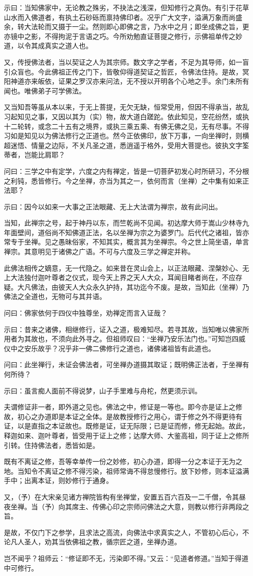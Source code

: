 示曰：当知佛家中，无论教之殊劣，不抉法之浅深，但知修行之真伪。有引于花草山水而入佛道者，有执土石砂砾而禀持佛印者。况乎广大文字，溢满万象而尚盛余，转大法轮而又摄于一尘。然则即心即佛之言，乃水中之月；即坐成佛之旨，更亦镜中之影，不得拘泥于言语之巧。今所劝勉直证菩提之修行，示佛祖单传之妙道，以令其成真实之道人也。

又，传授佛法者，当以契证之人为其宗师。数文字之学者，不足为其导师，如一盲引众盲也。今此佛祖正传之门下，皆敬仰得道契证之哲匠，令佛法住持。是故，冥阳神道亦来皈依，证果之罗汉亦来问法，无不授以开明各个心地之手。余门未所有闻也。唯佛弟子可学佛法。

又当知吾等虽从本以来，于无上菩提，无欠无缺，恒常受用，但因不得承当，故乱习起知见之事，又因以其为（实）物，故大道白蹉跎。依此知见，空花纷然，或执十二轮转，或念二十五有之境界，或执三乘五乘、有佛无佛之见，无有尽事。不得习如是知见以为佛法修行之正道也。然今正依佛印，放下万事，一向坐禅时，则横超迷悟、情量之边际，不关凡圣之道，悉逍遥于格外，受用大菩提也。彼执文字筌蒂者，岂能比肩耶？

问曰：三学之中有定学，六度之内有禅定，皆是一切菩萨初发心时所研习，不分根之利钝，悉皆修行。今之坐禅，亦当为其之一，依何而言（坐禅）之中集有如来正法耶？

示曰：因今以如来一大事之正法眼藏、无上大法谓为禅宗，故有此问出。

当知，此禅宗之号，起于神丹以东，而竺乾尚不见闻。初达摩大师于嵩山少林寺九年面壁间，道俗尚不知佛道正法，名以坐禅为宗之为婆罗门。后代代之诸祖，皆亦常专于坐禅。见之愚昧俗家，不知其实，概言其为坐禅宗。今之世上简坐语，单言禅宗。其意明见于诸佛之广语。不可与六度及三学之禅定并称。

此佛法相传之嫡意，无一代隐之。如来昔在灵山会上，以正法眼藏、涅槃妙心、无上大法独付迦叶尊者之仪式，现今天上界之天人大众，耳闻目睹者尚在，不应存疑。大凡佛法，由彼天人大众永久护持，其功迄今不废。是故，当知此（坐禅）乃佛法之全道也，无物可与其并语。

问曰：佛家依何于四仪中独尊坐，劝禅定而言入证哉？

示曰：昔来之诸佛，相继修行，证入之道，极难知尽。若寻其故，当知唯以佛家所用者为其故也，不须向此外寻之。但祖师叹曰：“坐禅乃安乐法门也。”可知岂四威仪中之安乐故乎？况乎非一佛二佛修行之道也，诸佛诸祖皆有此道也。

问曰：此坐禅行，未证会佛法者，可坐禅办道摄其取证；既明佛正法者，于坐禅有何所待？

示曰：虽言痴人面前不得说梦，山子手里难与舟柁，然更须示训。

夫谓修证非一者，即外道之见也。佛法之中，修证是一等也。即今亦是证上之修故，初心之办道即是本证之全体。是故教授修行之用心，谓于修之外不得更待有证，以是直指之本证故也。既修是证，证无际限；已是证而修，修无起始。故此，释迦如来、迦叶尊者，皆受用于证上之修；达摩大师、大鉴高祖，同于证上之修所引转。住持佛法者，悉皆如是。

既有不离证之修，吾等幸单传一份之妙修，初心办道，即得一分之本证于无为之地。当知令不离证之修不得污染，祖师常诲不得怠慢修行。放下妙修，则本证溢满手中；出离本证，则妙修行于通身。

又，（予）在大宋亲见诸方禅院皆构有坐禅堂，安置五百六百及一二千僧，令其昼夜坐禅。当（予）向其席主、传佛心印之宗师问佛法之大意，则教以修行非两段之旨。

是故，不仅门下之参学，且求法之高流，向佛法中求真实之人，不管初心后心，不论凡人圣人，劝其当依佛祖之教，循宗匠之道，坐禅办道。

岂不闻乎？祖师云：“修证即不无，污染即不得。”又云：“见道者修道。”当知于得道中可修行。

